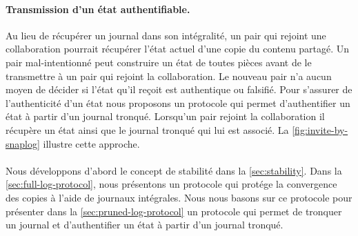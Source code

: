 \paragraph{Transmission d'un état authentifiable.} Au lieu de récupérer un journal dans son intégralité, un pair qui rejoint une collaboration pourrait récupérer l'état actuel d'une copie du contenu partagé.
Un pair mal-intentionné peut construire un état de toutes pièces avant de le transmettre à un pair qui rejoint la collaboration.
Le nouveau pair n'a aucun moyen de décider si l'état qu'il reçoit est authentique ou falsifié.
Pour s'assurer de l'authenticité d'un état nous proposons un protocole qui permet d'authentifier un état à partir d'un journal tronqué.
Lorsqu'un pair rejoint la collaboration il récupère un état ainsi que le journal tronqué qui lui est associé.
La \autoref{fig:invite-by-snaplog} illustre cette approche.

\paragraph{} Nous développons d'abord le concept de stabilité dans la \autoref{sec:stability}.
Dans la \autoref{sec:full-log-protocol}, nous présentons un protocole qui protége la convergence des copies à l'aide de journaux intégrales.
Nous nous basons sur ce protocole pour présenter dans la \autoref{sec:pruned-log-protocol} un protocole qui permet de tronquer un journal et d'authentifier un état à partir d'un journal tronqué.

